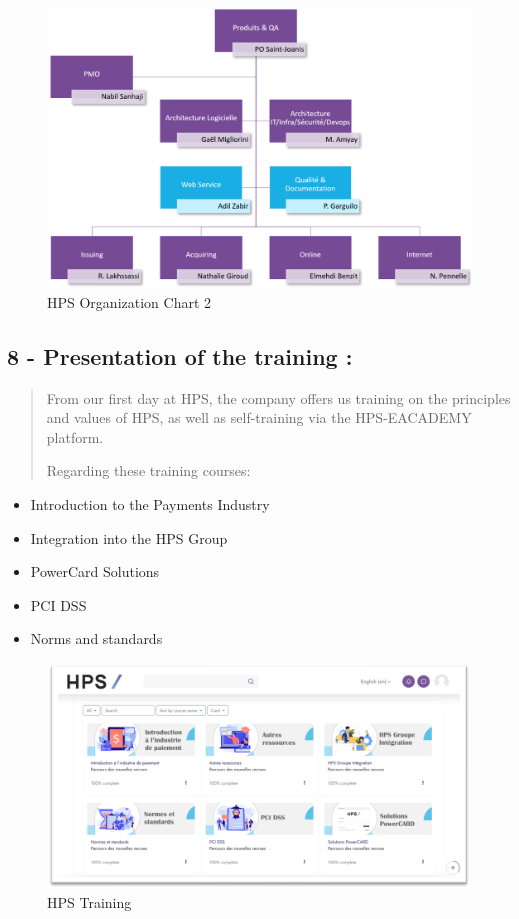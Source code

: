 \documentclass[12pt,a4paper]{report}
\begin{document}
\begin{figure}[H]
\centering
\includegraphics[width=6.4in]{media/image25.png}
\caption{HPS Organization Chart 2}
\label{fig:hpsOrgChart2}
\end{figure}

\subsection{8 - Presentation of the training :}

\begin{quote}
From our first day at HPS, the company offers us training on the principles and values of HPS, as well as self-training via the HPS-EACADEMY platform.

Regarding these training courses:
\end{quote}

\begin{itemize}
\item Introduction to the Payments Industry
\item Integration into the HPS Group
\item PowerCard Solutions
\item PCI DSS
\item Norms and standards
\end{itemize}

\begin{figure}[H]
\centering
\includegraphics[width=4.8in]{media/image26.png}
\caption{HPS Training}
\label{fig:hpsTraining}
\end{figure}
\end{document}
